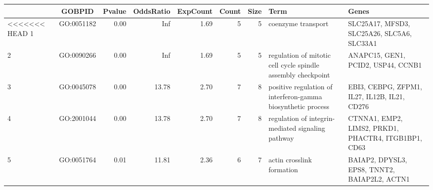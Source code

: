 
\begin{table}[ht]
\centering
\begin{tabular}{l|c|r|r|r|r|r|p{3cm}|p{3cm}|}
  \hline
 & GOBPID & Pvalue & OddsRatio & ExpCount & Count & Size & Term & Genes \\ 
  \hline
<<<<<<< HEAD
1 & GO:0051182 & 0.00 & Inf & 1.69 &   5 &   5 & coenzyme transport & SLC25A17, MFSD3, SLC25A26, SLC5A6, SLC33A1 \\ 
  2 & GO:0090266 & 0.00 & Inf & 1.69 &   5 &   5 & regulation of mitotic cell cycle spindle assembly checkpoint & ANAPC15, GEN1, PCID2, USP44, CCNB1 \\ 
  3 & GO:0045078 & 0.00 & 13.78 & 2.70 &   7 &   8 & positive regulation of interferon-gamma biosynthetic process & EBI3, CEBPG, ZFPM1, IL27, IL12B, IL21, CD276 \\ 
  4 & GO:2001044 & 0.00 & 13.78 & 2.70 &   7 &   8 & regulation of integrin-mediated signaling pathway & CTNNA1, EMP2, LIMS2, PRKD1, PHACTR4, ITGB1BP1, CD63 \\ 
  5 & GO:0051764 & 0.01 & 11.81 & 2.36 &   6 &   7 & actin crosslink formation & BAIAP2, DPYSL3, EPS8, TNNT2, BAIAP2L2, ACTN1 \\ 
   \hline
\end{tabular}
\end{table}
